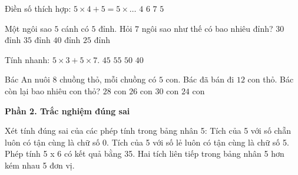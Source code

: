 \begin{ex} %
Điền số thích hợp: $5 \times 4 + 5 = 5 \times \dots$
\choice
{$4$}
{$6$}
{$7$}
{\True $5$}
\end{ex}

\begin{ex} %
Một ngôi sao $5$ cánh có $5$ đỉnh. Hỏi $7$ ngôi sao như thế có bao nhiêu đỉnh?
\choice
{$30$ đỉnh}
{\True $35$ đỉnh}
{$40$ đỉnh}
{$25$ đỉnh}
\end{ex}

\begin{ex} %
Tính nhanh: $5 \times 3 + 5 \times 7$.
\choice
{$45$}
{$55$}
{\True $50$}
{$40$}
\end{ex}

\begin{ex} %
Bác An nuôi $8$ chuồng thỏ, mỗi chuồng có $5$ con. Bác đã bán đi $12$ con thỏ. Bác còn lại bao nhiêu con thỏ?
\choice
{\True $28$ con}
{$26$ con}
{$30$ con}
{$24$ con}
\end{ex}

\textbf{Phần 2. Trắc nghiệm đúng sai}

\begin{ex} %
Xét tính đúng sai của các phép tính trong bảng nhân 5:
\choiceTF
{\True Tích của 5 với số chẵn luôn có tận cùng là chữ số 0.}
{\True Tích của 5 với số lẻ luôn có tận cùng là chữ số 5.}
{Phép tính 5 x 6 có kết quả bằng 35.}
{\True Hai tích liên tiếp trong bảng nhân 5 hơn kém nhau 5 đơn vị.}
\end{ex}

